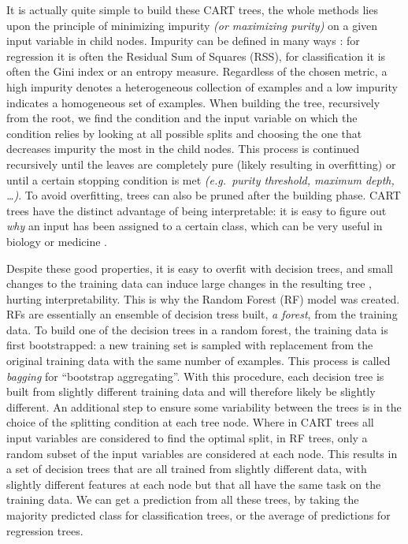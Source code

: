 \documentclass[
  11pt,
  twoside,
  BCOR=10mm,
  listof=totoc]{scrbook}
\begin{document}
It is actually quite simple to build these CART trees, the whole methods lies upon the principle of minimizing impurity \emph{(or maximizing purity)} on a given input variable in child nodes. Impurity can be defined in many ways \autocite{hastieElementsStatisticalLearning2009}: for regression it is often the Residual Sum of Squares (RSS), for classification it is often the Gini index or an entropy measure. Regardless of the chosen metric, a high impurity denotes a heterogeneous collection of examples and a low impurity indicates a homogeneous set of examples. When building the tree, recursively from the root, we find the condition and the input variable on which the condition relies by looking at all possible splits and choosing the one that decreases impurity the most in the child nodes. This process is continued recursively until the leaves are completely pure (likely resulting in overfitting) or until a certain stopping condition is met \emph{(e.g.~purity threshold, maximum depth, \ldots)}. To avoid overfitting, trees can also be pruned after the building phase. CART trees have the distinct advantage of being interpretable: it is easy to figure out \emph{why} an input has been assigned to a certain class, which can be very useful in biology or medicine \autocite{kingsfordWhatAreDecision2008}.

Despite these good properties, it is easy to overfit with decision trees, and small changes to the training data can induce large changes in the resulting tree \autocite{kingsfordWhatAreDecision2008,hastieElementsStatisticalLearning2009}, hurting interpretability. This is why the Random Forest (RF) model was created. RFs are essentially an ensemble of decision tress built, \emph{a forest}, from the training data. To build one of the decision trees in a random forest, the training data is first bootstrapped: a new training set is sampled with replacement from the original training data with the same number of examples. This process is called \emph{bagging} for ``bootstrap aggregating''. With this procedure, each decision tree is built from slightly different training data and will therefore likely be slightly different. An additional step to ensure some variability between the trees is in the choice of the splitting condition at each tree node. Where in CART trees all input variables are considered to find the optimal split, in RF trees, only a random subset of the input variables are considered at each node. This results in a set of decision trees that are all trained from slightly different data, with slightly different features at each node but that all have the same task on the training data. We can get a prediction from all these trees, by taking the majority predicted class for classification trees, or the average of predictions for regression trees.
\end{document}
